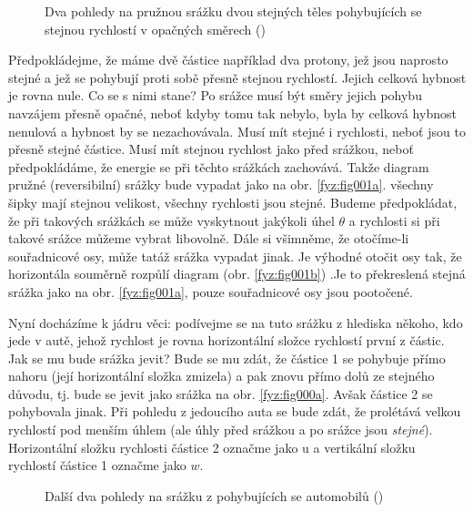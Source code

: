     \begin{figure}[ht!]  %
      \centering
      \caption{Dva pohledy na pružnou srážku dvou stejných těles pohybujících se stejnou rychlostí 
               v opačných směrech (\cite[s.~232]{Feynman01})}
      \label{fyz:fig001}
    \end{figure}
    
    Předpokládejme, že máme dvě částice například dva protony, jež jsou naprosto stejné a jež se 
    pohybují proti sobě přesně stejnou rychlostí. Jejich celková hybnost je rovna nule. Co se s 
    nimi stane? Po srážce musí být směry jejich pohybu navzájem přesně opačné, neboť kdyby tomu tak 
    nebylo, byla by celková hybnost nenulová a hybnost by se nezachovávala. Musí mít stejné i 
    rychlosti, neboť jsou to přesně stejné částice. Musí mít stejnou rychlost jako před srážkou, 
    neboť předpokládáme, že energie se při těchto srážkách zachovává. Takže diagram pružné 
    (reversibilní) srážky bude vypadat jako na obr. \ref{fyz:fig001a}. všechny šipky mají stejnou 
    velikost, všechny rychlosti jsou stejné. Budeme předpokládat, že při takových srážkách se může 
    vyskytnout jakýkoli úhel \(\theta\) a rychlosti si při takové srážce můžeme vybrat 
    libovolně. Dále si všimněme, že otočíme-li souřadnicové osy, může tatáž srážka vypadat jinak. 
    Je výhodné otočit osy tak, že horizontála souměrně rozpůlí diagram (obr. \ref{fyz:fig001b}) .Je 
    to překreslená stejná srážka jako na obr. \ref{fyz:fig001a}, pouze souřadnicové osy jsou 
    pootočené. 

    Nyní docházíme k jádru věci: podívejme se na tuto srážku z hlediska někoho, kdo jede v autě, 
    jehož rychlost je rovna horizontální složce rychlostí první z částic. Jak se mu bude srážka 
    jevit? Bude se mu zdát, že částice 1 se pohybuje přímo nahoru (její horizontální složka 
    zmizela) a pak znovu přímo dolů ze stejného důvodu, tj. bude se jevit jako srážka na obr. 
    \ref{fyz:fig000a}. Avšak částice 2 se pohybovala jinak. Při pohledu z jedoucího auta se bude 
    zdát, že prolétává velkou rychlostí pod menším úhlem (ale úhly před srážkou a po srážce jsou 
    \emph{stejné}). Horizontální složku rychlosti částice 2 označme jako u a vertikální složku 
    rychlostí částice 1 označme jako \(w\).
    
    \begin{figure}[ht!]  %
      \centering
      \caption{Další dva pohledy na srážku z pohybujících se automobilů (\cite[s.~232]{Feynman01})}
      \label{fyz:fig000}
    \end{figure}
    
